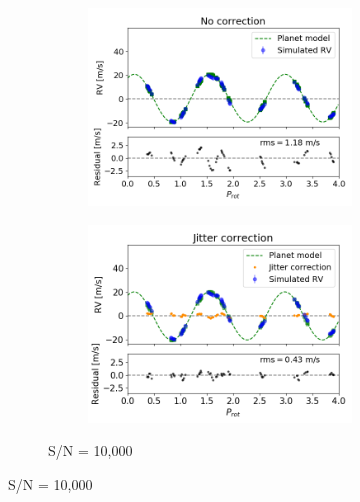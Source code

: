 \begin{figure}[tbp]	
\centering
    \begin{subfigure}[b]{1.0\textwidth}
    		\begin{subfigure}[b]{0.49\textwidth}
        		\includegraphics[width=\textwidth]{./Figures/Methods/Fitting_5-Fit2_a20_SN10000.png}
		\end{subfigure}
		\begin{subfigure}[b]{0.49\textwidth}        		
        		\includegraphics[width=\textwidth]{./Figures/Methods/Fitting_5-FitZX_a20_SN10000.png}
        	\end{subfigure}
        	\caption{S/N = 10,000}
    \end{subfigure}	       

\end{figure}
